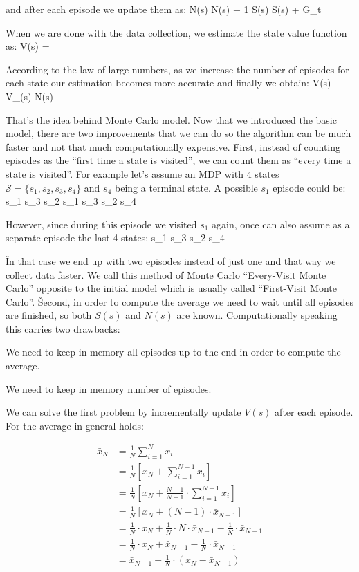 and after each episode we update them as:
\bse
N(s) \gets N(s) + 1 \qquad {} \qquad S(s) \gets S(s) + G_t
\ese

When we are done with the data collection, we estimate the state value function as:
\bse
V(s) = 
\ese

According to the law of large numbers, as we increase the number of episodes for each state our estimation becomes
more accurate and finally we obtain:
\bse
V(s) \to V_{\pi}(s) \:\:  \:\: N(s) \to \infty
\ese

That's the idea behind Monte Carlo model. Now that we introduced the basic model, there are two improvements that we
can do so the algorithm can be much faster and not that much computationally expensive. \v

First, instead of counting episodes as the ``first time a state is visited'', we can count them as ``every time a
state is visited''. For example let's assume an MDP with 4 states $\mathcal{S} = \{s_1, s_2, s_3,s_4\}$ and $s_4$
being a terminal state. A possible $s_1$ episode could be:
\bse
s_1 \to s_3 \to s_2 \to s_1 \to s_3 \to s_2 \to s_4
\ese

However, since during this episode we visited $s_1$ again, once can also assume as a separate episode the last 4 states:
\bse
s_1 \to s_3 \to s_2 \to s_4
\ese

\v

In that case we end up with two episodes instead of just one and that way we collect data faster. We call this method
of Monte Carlo ``Every-Visit Monte Carlo'' opposite to the initial model which is usually called ``First-Visit Monte
Carlo''. \v

Second, in order to compute the average we need to wait until all episodes are finished, so both $S(s)$ and $N(s)$
are known. Computationally speaking this carries two drawbacks:
\bit
\item We need to keep in memory all episodes up to the end in order to compute the average.
\item We need to keep in memory number of episodes.
\eit

We can solve the first problem by incrementally update $V(s)$ after each episode. For the average in general holds:

\vspace{-20pt}

{\setlength{\jot}{10pt}
\begin{align*}
\bar{x}_N &= \frac{1}{N} \sum_{i=1}^{N} x_i \\
&= \frac{1}{N} \left[ x_N + \sum_{i=1}^{N-1} x_i \right] \\
&= \frac{1}{N} \left[ x_N + \frac{N-1}{N-1} \cdot \sum_{i=1}^{N-1} x_i \right] \\
&= \frac{1}{N} \left[ x_N + (N-1) \cdot \bar{x}_{N-1} \right] \\
&= \frac{1}{N} \cdot x_N + \frac{1}{N} \cdot N \cdot \bar{x}_{N-1} - \frac{1}{N} \cdot \bar{x}_{N-1} \\
&= \frac{1}{N} \cdot x_N + \bar{x}_{N-1} - \frac{1}{N} \cdot \bar{x}_{N-1} \\
&= \bar{x}_{N-1} + \frac{1}{N} \cdot (x_N - \bar{x}_{N-1})
\end{align*}}

